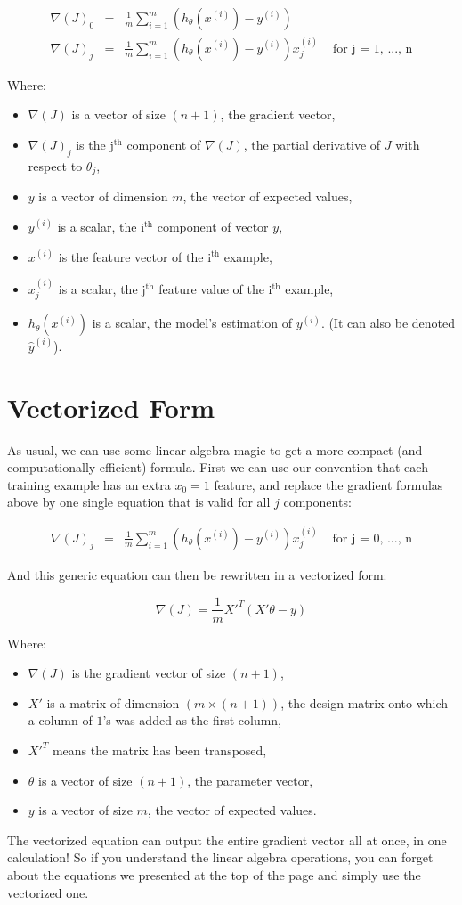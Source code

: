 $$
\begin{matrix}
\nabla(J)_0 &  = &\frac{1}{m}\sum_{i=1}^{m}(h_{\theta}(x^{(i)}) - y^{(i)}) & \\
\nabla(J)_j & = &\frac{1}{m}\sum_{i=1}^{m}(h_{\theta}(x^{(i)}) - y^{(i)})x_{j}^{(i)} & \text{ for j = 1, ..., n}    
\end{matrix}
$$

Where:
\begin{itemize}
    \item $\nabla(J)$ is a vector of size $(n + 1)$, the gradient vector,
    \item $\nabla(J)_j$ is the j$^\text{th}$ component of $\nabla(J)$, the partial derivative of $J$ with respect to $\theta_j$,
    \item $y$ is a vector of dimension $m$, the vector of expected values,
    \item $y^{(i)}$ is a scalar, the i$^\text{th}$ component of vector $y$,
    \item $x^{(i)}$ is the feature vector of the i$^\text{th}$ example,
    \item $x^{(i)}_j$ is a scalar, the j$^\text{th}$ feature value of the i$^\text{th}$ example,
    \item $h_{\theta}(x^{(i)})$ is a scalar, the model's estimation of $y^{(i)}$. (It can also be denoted $\hat{y}^{(i)}$).
\end{itemize}


\section*{Vectorized Form}
As usual, we can use some linear algebra magic to get a more compact (and computationally efficient) formula.
First we can use our convention that each training example has an extra $x_0 = 1$ feature, and replace the gradient formulas above by one single equation that is valid for all $j$ components:

$$
\begin{matrix}
\nabla(J)_j & = &\frac{1}{m}\sum_{i=1}^{m}(h_{\theta}(x^{(i)}) - y^{(i)})x_{j}^{(i)} & \text{ for j = 0, ..., n}
\end{matrix}
$$

And this generic equation can then be rewritten in a vectorized form:

$$
\nabla(J) = \frac{1}{m} {X'}^T(X'\theta - y)
$$  

Where:  
\begin{itemize}
    \item $\nabla(J)$ is the gradient vector of size $(n + 1)$,
    \item $X'$ is a matrix of dimension $(m \times (n + 1))$, the design matrix onto which a column of $1$'s was added as the first column,
    \item ${X'}^T$ means the matrix has been transposed,
    \item $\theta$ is a vector of size $(n + 1)$, the parameter vector, 
    \item $y$ is a vector of size $m$, the vector of expected values.
\end{itemize}

The vectorized equation can output the entire gradient vector all at once, in one calculation!
So if you understand the linear algebra operations, you can forget about the equations we presented at the top of the page and simply use the vectorized one.
